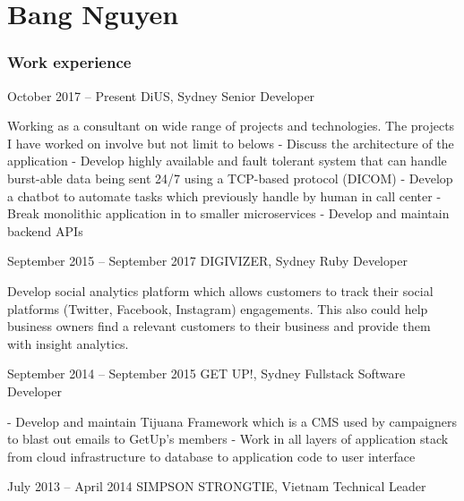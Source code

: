 \documentclass{tccv}
\begin{document}
\part{Bang Nguyen}

\section{Work experience}

\begin{eventlist}

\item{October 2017 -- Present}
    {DiUS, Sydney}
    {Senior Developer}

    Working as a consultant on wide range of projects and technologies. The projects
    I have worked on involve but not limit to belows
    \newline- Discuss the architecture of the application
    \newline- Develop highly available and fault tolerant system that can handle
    burst-able data being sent 24/7 using a TCP-based protocol (DICOM)
    \newline- Develop a chatbot to automate tasks which previously handle by
    human in call center
    \newline- Break monolithic application in to smaller microservices
    \newline- Develop and maintain backend APIs

\item{September 2015 -- September 2017}
    {DIGIVIZER, Sydney}
    {Ruby Developer}

    Develop social analytics platform which allows customers to track their
    social platforms (Twitter, Facebook, Instagram) engagements.
    This also could help business owners find a relevant customers
    to their business and provide them with insight analytics.

\item{September 2014 -- September 2015}
    {GET UP!, Sydney}
    {Fullstack Software Developer}

    - Develop and maintain Tijuana Framework which is a CMS
    used by campaigners to blast out emails to GetUp's members
    \newline - Work in all layers of application stack from cloud infrastructure
    to database to application code to user interface

\item{July 2013 -- April 2014}
    {SIMPSON STRONGTIE, Vietnam}
    {Technical Leader}


\end{eventlist}
\end{document}
